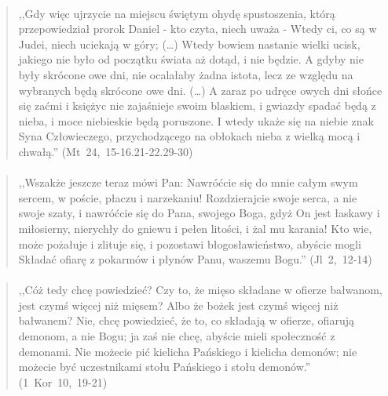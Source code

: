 \documentclass[10pt,a4paper,oneside]{article}
\begin{document}
\paragraph{}
\begin{quote}
,,Gdy więc ujrzycie na miejscu świętym ohydę spustoszenia, którą przepowiedział prorok Daniel - kto czyta, niech uważa - Wtedy ci, co są w Judei, niech uciekają w góry; (\ldots) Wtedy bowiem nastanie wielki ucisk, jakiego nie było od początku świata aż dotąd, i nie będzie. A gdyby nie były skrócone owe dni, nie ocalałaby żadna istota, lecz ze względu na wybranych będą skrócone owe dni. (\ldots) A zaraz po udręce owych dni słońce się zaćmi i księżyc nie zajaśnieje swoim blaskiem, i gwiazdy spadać będą z nieba, i moce niebieskie będą poruszone. I wtedy ukaże się na niebie znak Syna Człowieczego, przychodzącego na obłokach nieba z wielką mocą i chwałą.'' \mbox{(Mt 24, 15-16.21-22.29-30)}
\end{quote}
\paragraph{}
\begin{quote}
,,Wszakże jeszcze teraz mówi Pan: Nawróćcie się do mnie całym swym sercem, w poście, płaczu i narzekaniu! Rozdzierajcie swoje serca, a nie swoje szaty, i nawróćcie się do Pana, swojego Boga, gdyż On jest łaskawy i miłosierny, nierychły do gniewu i pełen litości, i żal mu karania! Kto wie, może pożałuje i zlituje się, i pozostawi błogosławieństwo, abyście mogli Składać ofiarę z pokarmów i płynów Panu, waszemu Bogu.'' \mbox{(Jl 2, 12-14)}
\end{quote}
\paragraph{}
\begin{quote}
,,Cóż tedy chcę powiedzieć? Czy to, że mięso składane w ofierze bałwanom, jest czymś więcej niż mięsem? Albo że bożek jest czymś więcej niż bałwanem? Nie, chcę powiedzieć, że to, co składają w ofierze, ofiarują demonom, a nie Bogu; ja zaś nie chcę, abyście mieli społeczność z demonami. Nie możecie pić kielicha Pańskiego i kielicha demonów; nie możecie być uczestnikami stołu Pańskiego i stołu demonów.'' \mbox{(1 Kor 10, 19-21)}
\end{quote}
\end{document}
